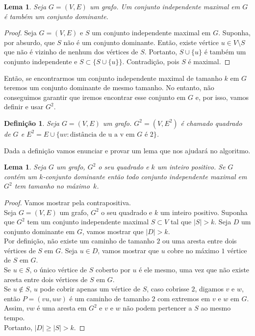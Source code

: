 \documentclass[12pt]{article}
\newtheorem{lemma}[theorem]{Lema}
\newtheorem{definition}[theorem]{Definição}
\begin{document}
\begin{lemma}\label{lemma:2.8}
    Seja $G = (V,E)$ um grafo. Um conjunto independente maximal em $G$ é também um conjunto dominante.
\end{lemma}
\begin{proof}
    Seja $G = (V,E)$ e $S$ um conjunto independente maximal em $G$. Suponha, por absurdo, que $S$ não é um conjunto dominante. Então, existe vértice $u \in V \setminus S$ que não é vizinho de nenhum dos vértices de $S$. Portanto, $S \cup \{u\}$ é também um conjunto independente e $S \subset \{S \cup \{u\}\}$. Contradição, pois $S$ é maximal.
\end{proof}
Então, se encontrarmos um conjunto independente maximal de tamanho $k$ em $G$ teremos um conjunto dominante de mesmo tamanho. No entanto, não conseguimos garantir que iremos encontrar esse conjunto em $G$ e, por isso, vamos definir e usar $G^2$.
\begin{definition}
    Seja $G= (V,E)$ um grafo. $G^2 = (V,E^2)$ é chamado \emph{quadrado} de $G$ e $E^2 = E \cup \{uv: \text{distância de u a v em $G$ é $2$}\}$.
\end{definition}
Dada a definição vamos enunciar e provar um lema que nos ajudará no algoritmo.
\begin{lemma}\label{lemma:2.10}
    Seja $G$ um grafo, $G^2$ o seu quadrado e $k$ um inteiro positivo. Se $G$ contém um $k$-conjunto dominante então todo conjunto independente maximal em $G^2$ tem tamanho no máximo~$k$.
\end{lemma}
\begin{proof}
    Vamos mostrar pela contrapositiva.\\
    Seja $G = (V,E)$ um grafo, $G^2$ o seu quadrado e $k$ um inteiro positivo. Suponha que $G^2$ tem um conjunto independente maximal $S \subset V$ tal que $|S| > k$. Seja $D$ um conjunto dominante em $G$, vamos mostrar que $|D| > k$. \\
    Por definição, não existe um caminho de tamanho $2$ ou uma aresta entre dois vértices de $S$ em $G$. Seja $u \in D$, vamos mostrar que $u$ cobre no máximo $1$ vértice de $S$ em $G$. \\
    Se $u \in S$, o único vértice de $S$ coberto por $u$ é ele mesmo, uma vez que não existe aresta entre dois vértices de $S$ em $G$. \\
    Se $u \not \in S$, $u$ pode cobrir apenas um vértice de $S$, caso cobrisse $2$, digamos $v$ e $w$, então $P = (vu,uw)$ é um caminho de tamanho $2$ com extremos em $v$ e $w$ em $G$. Assim, $vw$ é uma aresta em $G^2$ e $v$ e $w$ não podem pertencer a $S$ ao mesmo tempo. \\
    Portanto, $|D| \geq |S| > k$.
\end{proof}
\end{document}
